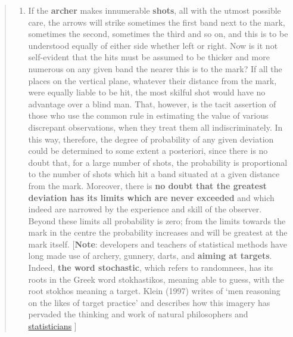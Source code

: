 \documentclass[]{book}
\providecommand{\tightlist}{%
  \setlength{\itemsep}{0pt}\setlength{\parskip}{0pt}}
\begin{document}
\begin{quote}
\begin{enumerate}
\def\labelenumi{\arabic{enumi}.}
\setcounter{enumi}{4}
\tightlist
\item
  If the \textbf{archer} makes innumerable \textbf{shots}, all with the utmost possible care, the arrows will strike sometimes the first band next to the mark, sometimes the second, sometimes the third and so on, and this is to be understood equally of either side whether left or right. Now is it not self-evident that the hits must be assumed to be thicker and more numerous on any given band the nearer this is to the mark? If all the places on the vertical plane, whatever their distance from the mark, were equally liable to be hit, the most skilful shot would have no advantage over a blind man. That, however, is the tacit assertion of those who use the common rule in estimating the value of various discrepant observations, when they treat them all indiscriminately. In this way, therefore, the degree of probability of any given deviation could be determined to some extent a posteriori, since there is no doubt that, for a large number of shots, the probability is proportional to the number of shots which hit a band situated at a given distance from the mark.
  Moreover, there is \textbf{no doubt that the greatest deviation has its limits which are never exceeded} and which indeed are narrowed by the experience and skill of the observer. Beyond these limits all probability is zero; from the limits towards the mark in the centre the probability increases and will be greatest at the mark itself. {[}\textbf{Note}: developers and teachers of statistical methods have long made use of archery, gunnery, darts, and \textbf{aiming at targets}. Indeed, \textbf{the word stochastic}, which refers to randomnees, has its roots in the Greek word stokhastikos, meaning able to guess, with the root stokhos meaning a target. Klein (1997) writes of `men reasoning on the likes of target practice' and describes how this imagery has pervaded the thinking and work of natural philosophers and \href{http://www.medicine.mcgill.ca/epidemiology/hanley/bios601/Likelihood/letter-jrssa-20110509.pdf}{statisticians} {]}
\end{enumerate}
\end{quote}
\end{document}

